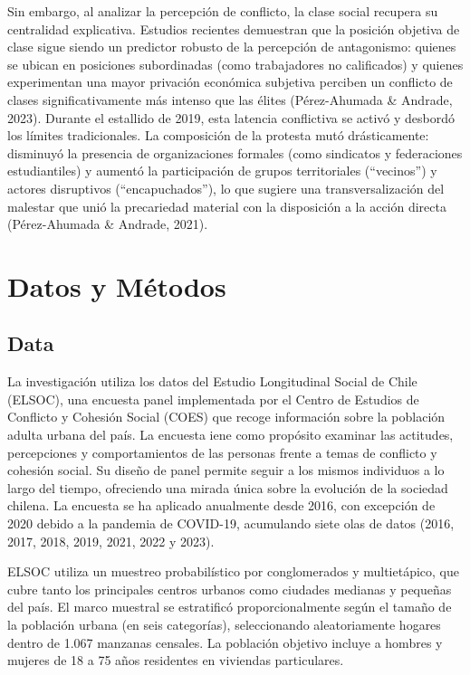 \documentclass[
  13pt,
]{article}
\begin{document}
Sin embargo, al analizar la percepción de conflicto, la clase social
recupera su centralidad explicativa. Estudios recientes demuestran que
la posición objetiva de clase sigue siendo un predictor robusto de la
percepción de antagonismo: quienes se ubican en posiciones subordinadas
(como trabajadores no calificados) y quienes experimentan una mayor
privación económica subjetiva perciben un conflicto de clases
significativamente más intenso que las élites (Pérez-Ahumada \& Andrade,
2023). Durante el estallido de 2019, esta latencia conflictiva se activó
y desbordó los límites tradicionales. La composición de la protesta mutó
drásticamente: disminuyó la presencia de organizaciones formales (como
sindicatos y federaciones estudiantiles) y aumentó la participación de
grupos territoriales (``vecinos'') y actores disruptivos
(``encapuchados''), lo que sugiere una transversalización del malestar
que unió la precariedad material con la disposición a la acción directa
(Pérez-Ahumada \& Andrade, 2021).

\section{Datos y Métodos}\label{datos-y-muxe9todos}

\subsection{Data}\label{data}

La investigación utiliza los datos del Estudio Longitudinal Social de
Chile (ELSOC), una encuesta panel implementada por el Centro de Estudios
de Conflicto y Cohesión Social (COES) que recoge información sobre la
población adulta urbana del país. La encuesta iene como propósito
examinar las actitudes, percepciones y comportamientos de las personas
frente a temas de conflicto y cohesión social. Su diseño de panel
permite seguir a los mismos individuos a lo largo del tiempo, ofreciendo
una mirada única sobre la evolución de la sociedad chilena. La encuesta
se ha aplicado anualmente desde 2016, con excepción de 2020 debido a la
pandemia de COVID-19, acumulando siete olas de datos (2016, 2017, 2018,
2019, 2021, 2022 y 2023).

ELSOC utiliza un muestreo probabilístico por conglomerados y
multietápico, que cubre tanto los principales centros urbanos como
ciudades medianas y pequeñas del país. El marco muestral se estratificó
proporcionalmente según el tamaño de la población urbana (en seis
categorías), seleccionando aleatoriamente hogares dentro de 1.067
manzanas censales. La población objetivo incluye a hombres y mujeres de
18 a 75 años residentes en viviendas particulares.
\end{document}
